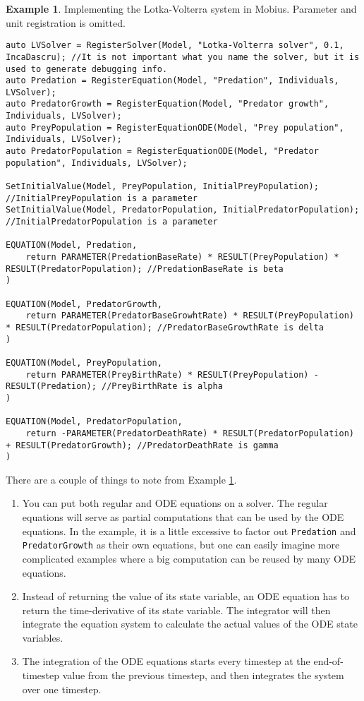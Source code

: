 \documentclass[11pt]{article}
\theoremstyle{definition}
\newtheorem{myexample}{Example}
\newenvironment{example}%
  {\begin{lrbox}{\examplebox}%
   \begin{minipage}{\dimexpr\linewidth-2\fboxsep}
   \begin{myexample}}%
  {\end{myexample}%
   \end{minipage}%
   \end{lrbox}%
   \begin{trivlist}
     \item[]\colorbox{silver}{\usebox\examplebox}
   \end{trivlist}}
\begin{document}
\begin{example}\label{ex:lotkavolterra}
Implementing the Lotka-Volterra system in Mobius. Parameter and unit registration is omitted.
\begin{lstlisting}[style=mycpp]
auto LVSolver = RegisterSolver(Model, "Lotka-Volterra solver", 0.1, IncaDascru); //It is not important what you name the solver, but it is used to generate debugging info.
auto Predation = RegisterEquation(Model, "Predation", Individuals, LVSolver);
auto PredatorGrowth = RegisterEquation(Model, "Predator growth", Individuals, LVSolver);
auto PreyPopulation = RegisterEquationODE(Model, "Prey population", Individuals, LVSolver);
auto PredatorPopulation = RegisterEquationODE(Model, "Predator population", Individuals, LVSolver);

SetInitialValue(Model, PreyPopulation, InitialPreyPopulation); //InitialPreyPopulation is a parameter
SetInitialValue(Model, PredatorPopulation, InitialPredatorPopulation); //InitialPredatorPopulation is a parameter

EQUATION(Model, Predation,
	return PARAMETER(PredationBaseRate) * RESULT(PreyPopulation) * RESULT(PredatorPopulation); //PredationBaseRate is beta
)

EQUATION(Model, PredatorGrowth,
	return PARAMETER(PredatorBaseGrowhtRate) * RESULT(PreyPopulation) * RESULT(PredatorPopulation); //PredatorBaseGrowthRate is delta
)

EQUATION(Model, PreyPopulation,
	return PARAMETER(PreyBirthRate) * RESULT(PreyPopulation) - RESULT(Predation); //PreyBirthRate is alpha
)

EQUATION(Model, PredatorPopulation,
	return -PARAMETER(PredatorDeathRate) * RESULT(PredatorPopulation) + RESULT(PredatorGrowth); //PredatorDeathRate is gamma
)
\end{lstlisting}
\end{example}

There are a couple of things to note from Example \ref{ex:lotkavolterra}.
\begin{enumerate}[i]
\item You can put both regular and ODE equations on a solver. The regular equations will serve as partial computations that can be used by the ODE equations. In the example, it is a little excessive to factor out {\tt Predation} and {\tt PredatorGrowth} as their own equations, but one can easily imagine more complicated examples where a big computation can be reused by many ODE equations.
\item Instead of returning the value of its state variable, an ODE equation has to return the time-derivative of its state variable. The integrator will then integrate the equation system to calculate the actual values of the ODE state variables.
\item The integration of the ODE equations starts every timestep at the end-of-timestep value from the previous timestep, and then integrates the system over one timestep.
\end{enumerate}
\end{document}
